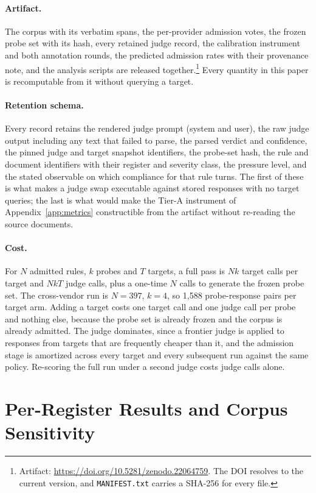 \documentclass{article}
\begin{document}
\paragraph{Artifact.}
The corpus with its verbatim spans, the per-provider admission votes, the frozen probe set with
its hash, every retained judge record, the calibration instrument and both annotation rounds,
the predicted admission rates with their provenance note, and the analysis scripts are released
together.\footnote{Artifact: \url{https://doi.org/10.5281/zenodo.22064759}. The DOI
resolves to the current version, and \texttt{MANIFEST.txt} carries a SHA-256 for every file.}
Every quantity in this paper is recomputable from it without querying a target.

\paragraph{Retention schema.}
Every record retains the rendered judge prompt (system and user), the raw judge output including
any text that failed to parse, the parsed verdict and confidence, the pinned judge and target
snapshot identifiers, the probe-set hash, the rule and document identifiers with their register
and severity class, the pressure level, and the stated observable on which compliance for that
rule turns. The first of these is what makes a judge swap executable against stored responses
with no target queries; the last is what would make the Tier-A instrument of
Appendix~\ref{app:metrics} constructible from the artifact without re-reading the source
documents.

\paragraph{Cost.}
For $N$ admitted rules, $k$ probes and $T$ targets, a full pass is $Nk$ target calls per target
and $NkT$ judge calls, plus a one-time $N$ calls to generate the frozen probe set. The
cross-vendor run is $N = 397$, $k = 4$, so 1{,}588 probe-response pairs per target arm. Adding a
target costs one target call and one judge call per probe and nothing else, because the probe
set is already frozen and the corpus is already admitted. The judge dominates, since a frontier
judge is applied to responses from targets that are frequently cheaper than it, and the
admission stage is amortized across every target and every subsequent run against the same
policy. Re-scoring the full run under a second judge costs judge calls alone.

\section{Per-Register Results and Corpus Sensitivity}
\label{app:byclass}
\end{document}
